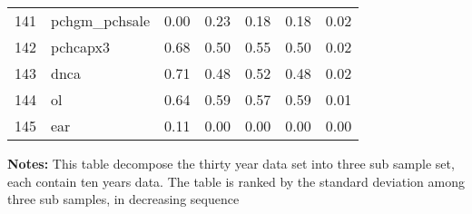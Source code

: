 \documentclass[12pt]{article}
\begin{document}
\begin{footnotesize}
\begin{longtable}{rl|c|c|c|c|c}
				141                  & pchgm\_pchsale              & 0.00                             & 0.23                                                                                          & 0.18                                                                                          & 0.18                                                                                          & 0.02                                                                                                   \\
				142                  & pchcapx3                    & 0.68                             & 0.50                                                                                          & 0.55                                                                                          & 0.50                                                                                          & 0.02                                                                                                   \\
				143                  & dnca                        & 0.71                             & 0.48                                                                                          & 0.52                                                                                          & 0.48                                                                                          & 0.02                                                                                                   \\
				144                  & ol                          & 0.64                             & 0.59                                                                                          & 0.57                                                                                          & 0.59                                                                                          & 0.01                                                                                                   \\
				145                  & ear                         & 0.11                             & 0.00                                                                                          & 0.00                                                                                          & 0.00                                                                                          & 0.00                                                                                                   \\ \hline
		
	\end{longtable}
{\bf Notes:}
\bigskip
This table decompose the thirty year data set into three sub sample set, each contain ten years data. The table is ranked by the standard deviation among three sub samples, in decreasing sequence
\end{footnotesize}
\end{document}
